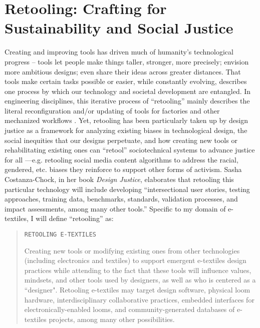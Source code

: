 \section{Retooling: Crafting for Sustainability and Social Justice}

Creating and improving tools has driven much of humanity's technological progress -- tools let people make things taller, stronger, more precisely; envision more ambitious designs; even share their ideas across greater distances. That tools make certain tasks possible or easier, while constantly evolving, describes one process by which our technology and societal development are entangled. In engineering disciplines, this iterative process of ``retooling'' mainly describes the literal reconfiguration and/or updating of tools for factories and other mechanized workflows \cite{merriam-webster_retool_2023}. Yet, retooling has been particularly taken up by design justice as a framework for analyzing existing biases in technological design, the social inequities that our designs perpetuate, and how creating new tools or rehabilitating existing ones can ``retool'' sociotechnical systems to advance justice for all \cite{costanza-chock_design_2020}---e.g. retooling social media content algorithms to address the racial, gendered, etc. biases they reinforce to support other forms of activism. Sasha Costanza-Chock, in her book \textit{Design Justice}, elaborates that retooling this particular technology will include developing ``intersectional user stories, testing approaches, training data, benchmarks, standards, validation processes, and impact assessments, among many other tools.'' Specific to my domain of e-textiles, I will define ``retooling'' as:

\noindent\begin{minipage}{\linewidth}
\begin{quote}
  \texttt{RETOOLING E-TEXTILES}

  Creating new tools or modifying existing ones from other technologies (including electronics and textiles) to support emergent e-textiles design practices while attending to the fact that these tools will influence values, mindsets, and other tools used by designers, as well as who is centered as a ``designer". Retooling e-textiles may target design software, physical loom hardware, interdisciplinary collaborative practices, embedded interfaces for electronically-enabled looms, and community-generated databases of e-textiles projects, among many other possibilities.
\end{quote}
\vspace{1em}
\end{minipage}

